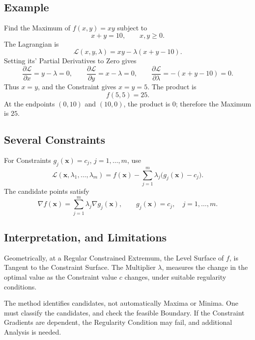 \documentclass[a4paper, 10pt, onepage]{elegantbook}
\begin{document}
{\subsection{Example}

Find the Maximum of \(f(x,y)=xy\) subject to
\[
x+y=10,\qquad x,y\geq 0.
\]
The Lagrangian is
\[
\mathcal{L}(x,y,\lambda)=xy-\lambda(x+y-10).
\]
Setting its' Partial Derivatives to Zero gives
\[
\frac{\partial\mathcal{L}}{\partial x}=y-\lambda=0,
\qquad
\frac{\partial\mathcal{L}}{\partial y}=x-\lambda=0,
\qquad
\frac{\partial\mathcal{L}}{\partial\lambda}=-(x+y-10)=0.
\]
Thus \(x=y\), and the Constraint gives \(x=y=5\). The product is
\[
f(5,5)=25.
\]
At the endpoints \((0,10)\) and \((10,0)\), the product is \(0\);
therefore the Maximum is \(25\).

\subsection{Several Constraints}

For Constraints \(g_j(\mathbf{x})=c_j\), \(j=1,\ldots,m\), use
\[
\mathcal{L}(\mathbf{x},\lambda_1,\ldots,\lambda_m)
=f(\mathbf{x})
-\sum_{j=1}^{m}\lambda_j\bigl(g_j(\mathbf{x})-c_j\bigr).
\]
The candidate points satisfy
\[
\nabla f(\mathbf{x})
=\sum_{j=1}^{m}\lambda_j\nabla g_j(\mathbf{x}),
\qquad
g_j(\mathbf{x})=c_j,\quad j=1,\ldots,m.
\]

\subsection{Interpretation, and Limitations}

Geometrically, at a Regular Constrained Extremum, the Level Surface of \(f\), is Tangent to the Constraint Surface. The 
Multiplier
\(\lambda\), measures the change in the optimal value as the Constraint value \(c\) changes, under suitable regularity 
conditions.

The method identifies candidates, not automatically Maxima or Minima. One must classify the candidates, and check the 
feasible Boundary. If the Constraint Gradients are dependent, the Regularity Condition may fail, and additional 
Analysis is needed.




























}
\end{document}
